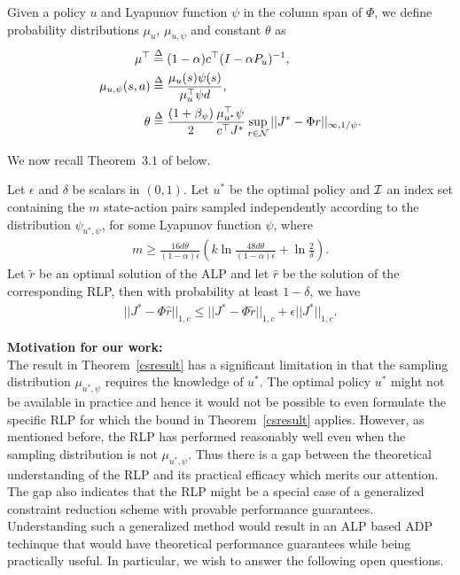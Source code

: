 \begin{definition}\label{sampdist}
Given a policy $u$ and Lyapunov function $\psi$ in the column span of $\Phi$, we define probability distributions $\mu_u$, $\mu_{u,\psi}$ and constant $\theta$ as 
\begin{align}
\mu^\top&\stackrel{\Delta}{=}(1-\alpha)c^\top (I-\alpha P_u)^{-1},\nonumber\\
\mu_{u,\psi}(s,a)&\stackrel{\Delta}{=}\frac{\mu_{u}(s) \psi(s)}{\mu_u^\top \psi d},\nonumber\\
\theta&\stackrel{\Delta}{=}\frac{(1+\beta_{\psi})}{2}\frac{\mu_{u^*}^\top \psi}{c^\top J^*}\sup_{r\in \mathcal{N}}||J^*-\Phi r||_{\infty,1/\psi}.
\end{align}
\end{definition}
We now recall Theorem~$3.1$ of \cite{CS} below.
\begin{theorem}\label{csresult}
Let $\epsilon$ and $\delta$ be scalars in $(0,1)$. Let $u^*$ be the optimal policy and $\mathcal{I}$ an index set containing the $m$ state-action pairs sampled independently according to the distribution $\psi_{u^*,\psi}$, for some Lyapunov function $\psi$, where
\begin{align}
m\geq \frac{16d\theta}{(1-\alpha)\epsilon}\left(k\ln\frac{48d\theta}{(1-\alpha)\epsilon}+\ln\frac{2}{\delta}\right).
\end{align}
Let $\tilde{r}$ be an optimal	solution of the ALP and let $\hat{r}$ be the solution of the corresponding RLP, then with probability at least $1-\delta$, we have
\begin{align}
||J^*-\Phi \hat{r}||_{1,c}\leq ||J^*-\Phi \tilde{r}||_{1,c}+\epsilon||J^*||_{1,c}.
\end{align}
\end{theorem}
\textbf{Motivation for our work:}\\
The result in Theorem~\ref{csresult} has a significant limitation in that the sampling distribution $\mu_{u^*,\psi}$ requires the knowledge of $u^*$. The optimal policy $u^*$ might not be available in practice and hence it would not be possible to even formulate the specific RLP for which the bound in Theorem~\ref{csresult} applies. However, as mentioned before, the RLP has performed reasonably well even when the sampling distribution is not $\mu_{u^*,\psi}$. Thus there is a gap between the theoretical understanding of the RLP and its practical efficacy which merits our attention. The gap also indicates that the RLP might be a special case of a generalized constraint reduction scheme with provable performance guarantees. Understanding such a generalized method would result in an ALP based ADP techinque that would have theoretical performance guarantees while being practically useful. In particular, we wish to answer the following open questions.
